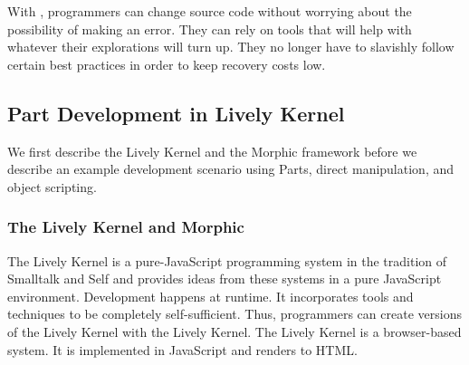 With \coexist, programmers can change source code without worrying
about the possibility of making an error. They can rely on tools that
will help with whatever their explorations will turn up. They no
longer have to slavishly follow certain best practices in order to keep recovery
costs low.



\subsection{Part Development in Lively Kernel}
We first describe the Lively Kernel and the Morphic framework before
we describe an example development scenario using Parts, direct
manipulation, and object scripting.

\subsubsection{The Lively Kernel and Morphic}
The Lively Kernel is a pure-JavaScript programming system in the
tradition of Smalltalk and Self and provides ideas from these systems
in a pure JavaScript environment. Development happens at runtime.  It
incorporates tools and techniques to be completely self-sufficient.
Thus, programmers can create versions of the Lively Kernel with the
Lively Kernel. The Lively Kernel is a browser-based system.  It is
implemented in JavaScript and renders to HTML.

